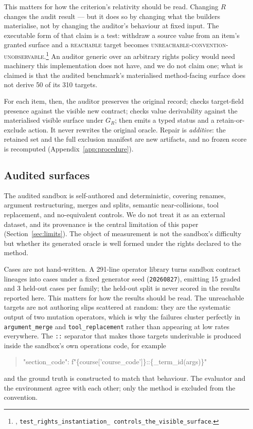 \documentclass[11pt]{article}
\newcommand{\artifact}[1]{\path{#1}}
\newcommand{\st}[1]{\textsc{\small #1}}
\newcommand{\dfam}[1]{\texttt{#1}}
\begin{document}
This matters for how the criterion's relativity should be read. Changing $R$
changes the audit result --- but it does so by changing what the builders
materialise, not by changing the auditor's behaviour at fixed input. The
executable form of that claim is a test: withdraw a source value from an
item's granted surface and a \st{reachable} target becomes
\st{unreachable-convention-unobservable}.\footnote{%
\artifact{research/gate19/tests.py}, \texttt{test\_rights\_instantiation\_%
controls\_the\_visible\_surface}.} An auditor generic over an arbitrary rights
policy would need machinery this implementation does not have, and we do not
claim one; what is claimed is that the audited benchmark's materialised
method-facing surface does not derive 50 of its 310 targets.

For each item, then, the auditor preserves the original record; checks
target-field presence against the visible new contract; checks value
derivability against the materialised visible surface under $G_R$; then emits a
typed status and a retain-or-exclude action. It never rewrites the original
oracle. Repair is \emph{additive}: the retained set and the full exclusion
manifest are new artifacts, and no frozen score is recomputed
(Appendix~\ref{app:procedure}).

\subsection{Audited surfaces}

The audited sandbox is self-authored and deterministic, covering renames,
argument restructuring, merges and splits, semantic near-collisions, tool
replacement, and no-equivalent controls. We do not treat it as an external
dataset, and its provenance is the central limitation of this paper
(Section~\ref{sec:limits}). The object of measurement is not the sandbox's
difficulty but whether its generated oracle is well formed under the rights
declared to the method.

Cases are not hand-written. A 291-line operator library turns sandbox contract
lineages into cases under a fixed generator seed (\texttt{20260827}), emitting
15 graded and 3 held-out cases per family; the held-out split is never scored
in the results reported here. This matters for how the results should be read.
The unreachable targets are not authoring slips scattered at random: they are
the systematic output of two mutation operators, which is why the failures
cluster perfectly in \dfam{argument\_merge} and \dfam{tool\_replacement} rather
than appearing at low rates everywhere. The \texttt{::} separator that makes
those targets underivable is produced inside the sandbox's own operations code,
for example
\begin{quote}\ttfamily\footnotesize
"section\_code": f"\{course['course\_code']\}::\{\_term\_id(args)\}"
\end{quote}
and the ground truth is constructed to match that behaviour. The evaluator and
the environment agree with each other; only the method is excluded from the
convention.
\end{document}
